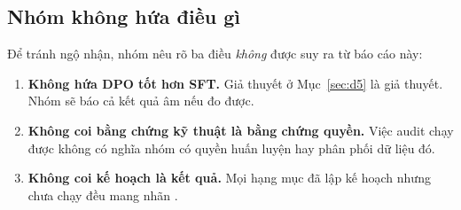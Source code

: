 \subsection{Nhóm không hứa điều gì}

Để tránh ngộ nhận, nhóm nêu rõ ba điều \emph{không} được suy ra từ báo cáo này:

\begin{enumerate}[leftmargin=2em]
\item \textbf{Không hứa DPO tốt hơn SFT.} Giả thuyết ở Mục~\ref{sec:d5} là giả
thuyết. Nhóm sẽ báo cả kết quả âm nếu đo được.
\item \textbf{Không coi bằng chứng kỹ thuật là bằng chứng quyền.} Việc audit chạy
được không có nghĩa nhóm có quyền huấn luyện hay phân phối dữ liệu đó.
\item \textbf{Không coi kế hoạch là kết quả.} Mọi hạng mục đã lập kế hoạch nhưng
chưa chạy đều mang nhãn \chualam.
\end{enumerate}

